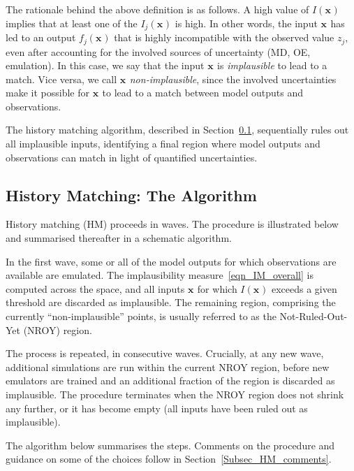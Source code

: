 \documentclass[preprint,12pt, sort&compress]{elsarticle}
\newcommand{\bd}[1]{\boldsymbol{#1}}
\newcommand{\x}[1][]{\bd{x_{#1}}}
\begin{document}
The rationale behind the above definition is as follows. A high value of $I(\x)$ implies that at least one of the $I_j(\x)$ is high. In other words, the input $\x$ has led to an output $f_j(\x)$ that is highly incompatible with the observed value $z_j$, even after accounting for the involved sources of uncertainty (MD, OE, emulation). In this case, we say that the input $\x$ is \textit{implausible} to lead to a match. Vice versa, we call $\x$ \textit{non-implausible}, since the involved uncertainties make it possible for $\x$ to lead to a match between model outputs and observations.

The history matching algorithm, described in Section~\ref{Subsec_HM}, sequentially rules out all implausible inputs, identifying a final region where model outputs and observations can match in light of quantified uncertainties. 


\subsection{History Matching: The Algorithm}\label{Subsec_HM}

History matching (HM) proceeds in waves. The procedure is illustrated below and summarised thereafter in a schematic algorithm.

In the first wave, some or all of the model outputs for which observations are available are emulated. The implausibility measure~\eqref{eqn_IM_overall} is computed across the space, and all inputs $\x$ for which $I(\x)$ exceeds a given threshold are discarded as implausible. The remaining region, comprising the currently “non-implausible” points, is usually referred to as the Not-Ruled-Out-Yet (NROY) region.

The process is repeated, in consecutive waves. Crucially, at any new wave, additional simulations are run within the current NROY region, before new emulators are trained and an additional fraction of the region is discarded as implausible. The procedure terminates when the NROY region does not shrink any further, or it has become empty (all inputs have been ruled out as implausible). 

The algorithm below summarises the steps. Comments on the procedure and guidance on some of the choices follow in Section~\ref{Subsec_HM_comments}.
\vspace{2ex}
\end{document}
